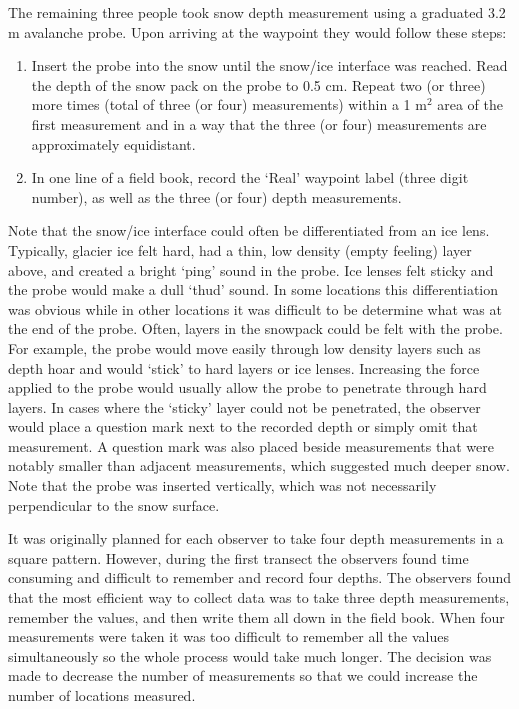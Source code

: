 \documentclass[12pt]{article}
\begin{document}
The remaining three people took snow depth measurement using a graduated 3.2 m avalanche probe. Upon arriving at the waypoint they would follow these steps:
\begin{enumerate}
\item Insert the probe into the snow until the snow/ice interface was reached. Read the depth of the snow pack on the probe to 0.5 cm. Repeat two (or three) more times (total of three (or four) measurements) within a 1 m$^2$ area of the first measurement and in a way that the three (or four) measurements are approximately equidistant. 
\item In one line of a field book, record the `Real' waypoint label (three digit number), as well as the three (or four) depth measurements. 
\end{enumerate}
Note that the snow/ice interface could often be differentiated from an ice lens. Typically, glacier ice felt hard, had a thin, low density (empty feeling) layer above, and created a bright `ping' sound in the probe. Ice lenses felt sticky and the probe would make a dull `thud' sound. In some locations this differentiation was obvious while in other locations it was difficult to be determine what was at the end of the probe. Often, layers in the snowpack could be felt with the probe. For example, the probe would move easily through low density layers such as depth hoar and would `stick' to hard layers or ice lenses. Increasing the force applied to the probe would usually allow the probe to penetrate through hard layers. In cases where the `sticky' layer could not be penetrated, the observer would place a question mark next to the recorded depth or simply omit that measurement. A question mark was also placed beside measurements that were notably smaller than adjacent measurements, which suggested much deeper snow. Note that the probe was inserted vertically, which was not necessarily perpendicular to the snow surface.

It was originally planned for each observer to take four depth measurements in a square pattern. However, during the first transect the observers found time consuming and difficult to remember and record four depths. The observers found that the most efficient way to collect data was to take three depth measurements, remember the values, and then write them all down in the field book. When four measurements were taken it was too difficult to remember all the values simultaneously so the whole process would take much longer. The decision was made to decrease the number of measurements so that we could increase the number of locations measured. 
\end{document}

